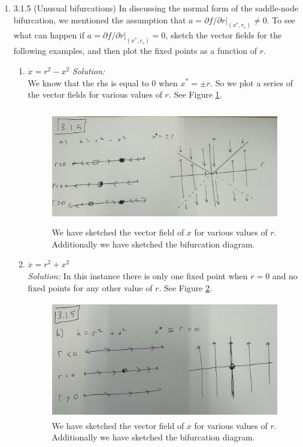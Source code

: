 \documentclass[10pt]{amsart}
\theoremstyle{nonumberplain}
\begin{document}
\begin{enumerate}[label={\bf {\arabic*}:}]
\newpage

\item 3.1.5 (Unusual bifurcations) In discussing the normal form of the saddle-node bifurcation, we mentioned the assumption that $a = \left. \partial f / \partial r \right|_{(x^*, r_c)} \neq 0.$
To see what can happen if $a = \left. \partial f / \partial r \right|_{(x^*, r_c)} = 0$, sketch the vector fields for the following examples, and then plot the fixed points as a function of $r$. \\


\begin{enumerate}
\item $\dot x = r^2 - x^2$ 
\textit{Solution:} \\
We know that the rhs is equal to 0 when $x^* = \pm r$. So we plot a series of the vector fields for various values of $r$. See Figure \ref{fig:f2}.

\begin{figure}[h]
	\centering
	\includegraphics[height=2in]{3_1_5_a.png}
 	\caption{We have sketched the vector field of $x$ for various values of $r$. Additionally we have sketched the bifurcation diagram.}\label{fig:f2}
\end{figure}

\item $\dot x = r^2 + x^2$ \\
\textit{Solution:} In this instance there is only one fixed point when $r = 0$ and no fixed points for any other value of $r$. See Figure \ref{fig:f3}.

\begin{figure}[h]
	\centering
	\includegraphics[height=2in]{3_1_5_b.png}
 	\caption{We have sketched the vector field of $x$ for various values of $r$. Additionally we have sketched the bifurcation diagram.}\label{fig:f3}
\end{figure}
\end{enumerate}


\end{enumerate}
\end{document}
